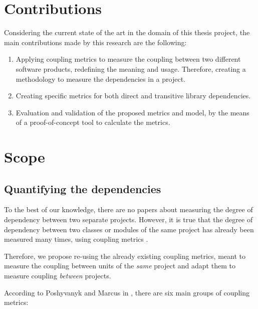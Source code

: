 \section{Contributions}
Considering the current state of the art in the domain of this thesis project, the main contributions made by this research are the following:

\begin{enumerate}
	\item Applying coupling metrics to measure the coupling between two different software products, redefining the meaning  and usage. Therefore, creating a methodology to measure the dependencies in a project. 
  \blankls

	\item Creating specific metrics for both direct and transitive library dependencies.\blankls {}

	\item Evaluation and validation of the proposed metrics and model, by the means of a proof-of-concept tool to calculate the metrics.
\end{enumerate}

\section{Scope}\label{section:scope} %
\subsection{Quantifying the dependencies}
To the best of our knowledge, there are no papers about measuring the degree of dependency between two separate projects. However, it is true that the degree of dependency between two classes or modules of the same project has already been measured many times, using coupling metrics \cite{briand1999unified}.

Therefore, we propose re-using the already existing coupling metrics, meant to measure the coupling between units of the \textit{same} project and adapt them to measure coupling \textit{between} projects.

\blankl
According to Poshyvanyk and Marcus in \cite{poshyvanyk2006conceptual}, there are six main groups of coupling metrics:

